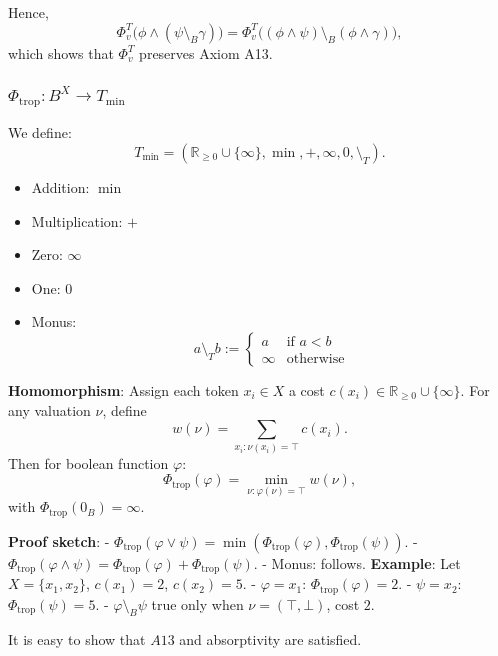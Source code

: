 Hence,
\[
\Phi_v^T\big(\phi \wedge (\psi \setminus_B \gamma)\big) = \Phi_v^T\big((\phi \wedge \psi) \setminus_B (\phi \wedge \gamma)\big),
\]
which shows that $\Phi_v^T$ preserves Axiom A13.


\subsubsection{$\Phi_{\mathrm{trop}}: B^X \to T_{\min}$}

We define:
$$
T_{\min} = (\mathbb{R}_{\ge 0} \cup \{\infty\},\min,+,\infty,0,\setminus_T).
$$
\begin{itemize}
    \item Addition: \(\min\)
    \item Multiplication: \(+\)
    \item Zero: \(\infty\)
    \item One: \(0\)
    \item Monus:
    \[
    a \setminus_T b :=
    \begin{cases}
        a & \text{if } a < b \\
        \infty & \text{otherwise}
    \end{cases}
    \]
\end{itemize}



\textbf{Homomorphism}:\newline
Assign each token \(x_i\in X\) a cost \(c(x_i)\in\mathbb{R}_{\ge0}\cup\{\infty\}\). For any valuation \(\nu\), define
$$
w(\nu) = \sum_{x_i:\nu(x_i)=\top} c(x_i).
$$
Then for boolean function  \(\varphi\):
$$
\Phi_{\mathrm{trop}}(\varphi) 
= \min_{\nu:\varphi(\nu)=\top} w(\nu),
$$
with \(\Phi_{\mathrm{trop}}(0_B)=\infty\).
\newline

\textbf{Proof sketch}: \newline
- \(\Phi_{\mathrm{trop}}(\varphi \vee \psi) = \min(\Phi_{\mathrm{trop}}(\varphi), \Phi_{\mathrm{trop}}(\psi))\).  
- \(\Phi_{\mathrm{trop}}(\varphi \wedge \psi) = \Phi_{\mathrm{trop}}(\varphi) + \Phi_{\mathrm{trop}}(\psi)\).  
- Monus: follows. \newline
\textbf{Example}: \newline
Let \(X=\{x_1,x_2\}\), \(c(x_1)=2\), \(c(x_2)=5\).  
- \(\varphi = x_1\): \(\Phi_{\mathrm{trop}}(\varphi)=2\).  
- \(\psi = x_2\): \(\Phi_{\mathrm{trop}}(\psi)=5\).  
- \(\varphi \setminus_B \psi\) true only when \(\nu=(\top,\bot)\), cost \(2\).

It is easy to show that $A13$ and absorptivity are satisfied.


